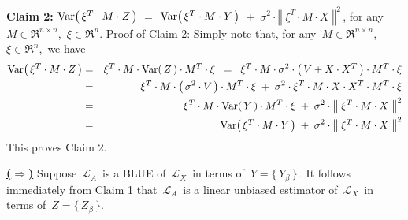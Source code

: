 \begin{enumerate}
	\vskip 0.3cm
	\noindent
	\textbf{Claim 2:}\quad
	$\textnormal{Var}\!\left(\,\xi^{T} \cdot M \cdot Z\,\right)$
	\;$=$\; $\textnormal{Var}\!\left(\,\xi^{T} \cdot M \cdot Y\,\right)$
		\,$+$\, $\sigma^{2} \cdot \left\Vert\; \xi^{T} \cdot M \cdot X \;\right\Vert^{2}$\,,
	for any \,$M \in \Re^{n \times n}$, \,$\xi \in \Re^{n}$.
	\vskip 0.0cm
	\noindent
	Proof of Claim 2:\quad
	Simply note that, for any \,$M \in \Re^{n \times n}$, \,$\xi \in \Re^{n}$,\, we have
	\begin{eqnarray*}
	\textnormal{Var}\!\left(\,\xi^{T} \cdot M \cdot Z\,\right)
	&=&
		\xi^{T} \cdot M \cdot \textnormal{Var}\!\left(\,Z\,\right) \cdot M^{T} \cdot \xi
	\;\; = \;\;
		\xi^{T} \cdot M \cdot \sigma^{2} \cdot \left(\, V + X \cdot X^{T} \,\right) \cdot M^{T} \cdot \xi
	\\
	&=&
		\xi^{T} \cdot M \cdot \left(\,\sigma^{2} \cdot V\,\right) \cdot M^{T} \cdot \xi
		\; + \;
		\sigma^{2} \cdot \xi^{T} \cdot M \cdot X \cdot X^{T} \cdot M^{T} \cdot \xi
	\\
	&=&
		\xi^{T} \cdot M \cdot \textnormal{Var}\!\left(\,Y\,\right) \cdot M^{T} \cdot \xi
		\; + \;
		\sigma^{2} \cdot \left\Vert\; \xi^{T} \cdot M \cdot X \; \right\Vert^{2}
	\\
	&=&
		\textnormal{Var}\!\left(\,\xi^{T} \cdot M \cdot Y\,\right)
		\; + \;
		\sigma^{2} \cdot \left\Vert\; \xi^{T} \cdot M \cdot X \; \right\Vert^{2}
	\end{eqnarray*}
	This proves Claim 2.
	
	\vskip 0.5cm
	\noindent
	\underline{\textbf{(\;$\Longrightarrow$\;)}}\quad
	Suppose \,$\mathcal{L}_{A}$\, is a BLUE of \,$\mathcal{L}_{X}$\, in terms of \,$Y = \{\,Y_{\beta}\,\}$.\,
	It follows immediately from Claim 1 that
	\,$\mathcal{L}_{A}$\, is a linear unbiased estimator of
	\,$\mathcal{L}_{X}$\, in terms of \,$Z = \{\,Z_{\beta}\,\}$.
	

\end{enumerate}
